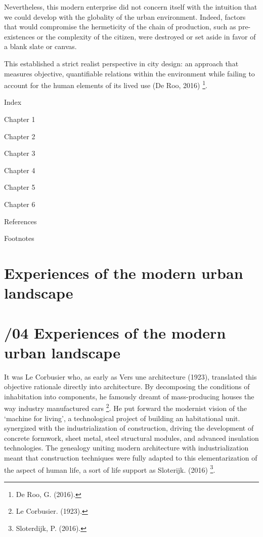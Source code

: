 \documentclass[
  letterpaper,
  DIV=11,
  numbers=noendperiod]{scrreprt}
\begin{document}
Nevertheless, this modern enterprise did not concern itself with the
intuition that we could develop with the globality of the urban
environment. Indeed, factors that would compromise the hermeticity of
the chain of production, such as pre-existences or the complexity of the
citizen, were destroyed or set aside in favor of a blank slate or
canvas.

This established a strict realist perspective in city design: an
approach that measures objective, quantifiable relations within the
environment while failing to account for the human elements of its lived
use (De Roo, 2016) \footnote{De Roo, G. (2016).}.

Index

Chapter 1

Chapter 2

Chapter 3

Chapter 4

Chapter 5

Chapter 6

References

Footnotes


\chapter{Experiences of the modern urban
landscape}\label{experiences-of-the-modern-urban-landscape}


\chapter{\texorpdfstring{{/04} Experiences of the modern urban
landscape}{/04 Experiences of the modern urban landscape}}\label{experiences-of-the-modern-urban-landscape-1}

It was Le Corbusier who, as early as Vers une architecture (1923),
translated this objective rationale directly into architecture. By
decomposing the conditions of inhabitation into components, he famously
dreamt of mass-producing houses the way industry manufactured cars
\footnote{Le Corbusier. (1923).}. He put forward the modernist vision of
the `machine for living', a technological project of building an
habitational unit. synergized with the industrialization of
construction, driving the development of concrete formwork, sheet metal,
steel structural modules, and advanced insulation technologies. The
genealogy uniting modern architecture with industrialization meant that
construction techniques were fully adapted to this elementarization of
the aspect of human life, a sort of life support as Sloterijk. (2016)
\footnote{Sloterdijk, P. (2016).}.
\end{document}
